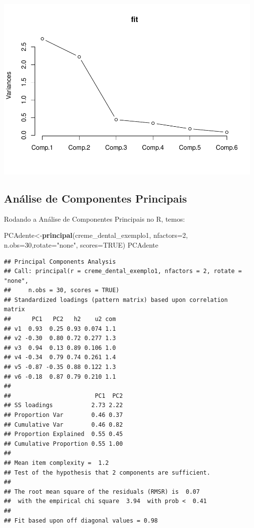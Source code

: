 \documentclass[12pt,brazil,]{book}
\newenvironment{Shaded}{\begin{snugshade}}{\end{snugshade}}
\newcommand{\DataTypeTok}[1]{\textcolor[rgb]{0.13,0.29,0.53}{#1}}
\newcommand{\DecValTok}[1]{\textcolor[rgb]{0.00,0.00,0.81}{#1}}
\newcommand{\KeywordTok}[1]{\textcolor[rgb]{0.13,0.29,0.53}{\textbf{#1}}}
\newcommand{\NormalTok}[1]{#1}
\newcommand{\OtherTok}[1]{\textcolor[rgb]{0.56,0.35,0.01}{#1}}
\newcommand{\StringTok}[1]{\textcolor[rgb]{0.31,0.60,0.02}{#1}}
\begin{document}
\includegraphics{03-AnaliseFat_files/figure-latex/unnamed-chunk-8-1.pdf}

\hypertarget{analise-de-componentes-principais}{%
\subsection{Análise de Componentes
Principais}\label{analise-de-componentes-principais}}

Rodando a Análise de Componentes Principais no R, temos:

\begin{Shaded}
\begin{Highlighting}[]
\NormalTok{PCAdente<-}\KeywordTok{principal}\NormalTok{(creme_dental_exemplo1, }\DataTypeTok{nfactors=}\DecValTok{2}\NormalTok{,}
                \DataTypeTok{n.obs=}\DecValTok{30}\NormalTok{,}\DataTypeTok{rotate=}\StringTok{"none"}\NormalTok{, }\DataTypeTok{scores=}\OtherTok{TRUE}\NormalTok{)}
\NormalTok{PCAdente}
\end{Highlighting}
\end{Shaded}

\begin{verbatim}
## Principal Components Analysis
## Call: principal(r = creme_dental_exemplo1, nfactors = 2, rotate = "none", 
##     n.obs = 30, scores = TRUE)
## Standardized loadings (pattern matrix) based upon correlation matrix
##      PC1   PC2   h2    u2 com
## v1  0.93  0.25 0.93 0.074 1.1
## v2 -0.30  0.80 0.72 0.277 1.3
## v3  0.94  0.13 0.89 0.106 1.0
## v4 -0.34  0.79 0.74 0.261 1.4
## v5 -0.87 -0.35 0.88 0.122 1.3
## v6 -0.18  0.87 0.79 0.210 1.1
## 
##                        PC1  PC2
## SS loadings           2.73 2.22
## Proportion Var        0.46 0.37
## Cumulative Var        0.46 0.82
## Proportion Explained  0.55 0.45
## Cumulative Proportion 0.55 1.00
## 
## Mean item complexity =  1.2
## Test of the hypothesis that 2 components are sufficient.
## 
## The root mean square of the residuals (RMSR) is  0.07 
##  with the empirical chi square  3.94  with prob <  0.41 
## 
## Fit based upon off diagonal values = 0.98
\end{verbatim}
\end{document}
